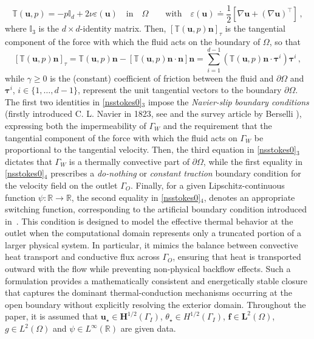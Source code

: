 \documentclass[10pt,a4paper]{article}
\begin{document}
$$
\mathbb{T}(\boldsymbol{u},p) = -p\mathbb{I}_{d} + 2 \nu \varepsilon(\boldsymbol{u})  \quad \text{in} \quad \Omega \qquad \text{with} \quad \varepsilon(\boldsymbol{u}) \doteq \dfrac{1}{2}[\nabla \boldsymbol{u} + (\nabla \boldsymbol{u})^{\intercal}] \, ,
$$
where $\mathbb{I}_{3}$ is the $d \times d$-identity matrix. Then, $\left[ \mathbb{T}(\boldsymbol{u},p) \boldsymbol{n} \right]_{\tau}$ is the tangential component of the force with which the fluid acts on the boundary of $\Omega$, so that
\begin{equation} \label{tangential}
\left[ \mathbb{T}(\boldsymbol{u},p) \boldsymbol{n} \right]_{\tau} = \mathbb{T}(\boldsymbol{u},p) \boldsymbol{n} - \left[\mathbb{T}(\boldsymbol{u},p) \boldsymbol{n} \cdot \boldsymbol{n} \right] \boldsymbol{n} = \sum_{i=1}^{d-1}
\left( \mathbb{T}(\boldsymbol{u},p)\boldsymbol{n} \cdot \boldsymbol{\tau}^i \right)\boldsymbol{\tau}^i \, ,
\end{equation}
while $\gamma \geq 0$ is the (constant) coefficient of friction between the fluid and $\partial \Omega$ and $\boldsymbol{\tau}^i$, $i \in \{1, \ldots , d-1 \}$, represent the unit tangential vectors to the boundary $\partial \Omega$. The first two identities in \eqref{nsstokes0}$_{3}$ impose the \textit{Navier-slip boundary conditions} (firstly introduced C. L. Navier in 1823, see \cite{navier1823memoire} and the survey article by Berselli \cite{berselli2010some}), expressing both the impermeability of $\Gamma_{W}$ and the requirement that the tangential component of the force with which the fluid acts on $\Gamma_{W}$ be proportional to the tangential velocity. Then, the third equation in \eqref{nsstokes0}$_{3}$ dictates that $\Gamma_{W}$ is a thermally convective part of $\partial \Omega$, while the first equality in \eqref{nsstokes0}$_{4}$ prescribes a \textit{do-nothing} or \textit{constant traction} boundary condition for the velocity field on the outlet $\Gamma_{O}$. Finally, for a given Lipschitz-continuous function $\psi : \mathbb{R} \longrightarrow \mathbb{R}$, the second equality in \eqref{nsstokes0}$_{4}$, denotes an appropriate switching function, corresponding to the artificial boundary condition introduced in~\cite{ceretani2019boussinesq}. This condition is designed to model the effective thermal behavior at the outlet when the computational domain represents only a truncated portion of a larger physical system. In particular, it mimics the balance between convective heat transport and conductive flux across $\Gamma_{O}$, ensuring that heat is transported outward with the flow while preventing non-physical backflow effects. Such a formulation provides a mathematically consistent and energetically stable closure that captures the dominant thermal-conduction mechanisms occurring at the open boundary without explicitly resolving the exterior domain.  Throughout the paper, it is assumed that $\boldsymbol{u} _{\star} \in \boldsymbol{H}^{1/2}(\Gamma_{I})$,  $\theta _{\star} \in H^{1/2}(\Gamma_{I})$, $\boldsymbol{f} \in \boldsymbol{L}^2(\Omega)$, $g \in L^{2}(\Omega)$ and $\psi \in L^{\infty}(\mathbb{R})$ are given data.
\end{document}
